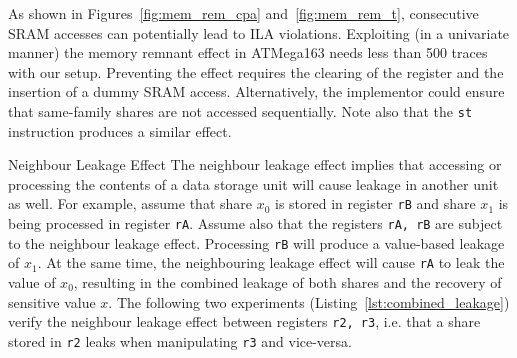 As shown in Figures~\ref{fig:mem_rem_cpa} and~\ref{fig:mem_rem_t}, consecutive SRAM accesses can potentially lead to ILA violations. Exploiting (in a univariate manner) the memory remnant effect in ATMega163 needs less than 500 traces with our setup. Preventing the effect requires the clearing of the register and the insertion of a dummy SRAM access. Alternatively, the implementor could ensure that same-family shares are not accessed sequentially. Note also that the \texttt{st} instruction produces a similar effect.
\begin{subsection}{Neighbour Leakage Effect}\label{combined_leakage}
The neighbour leakage effect implies that accessing or processing the contents of a data storage unit will cause leakage in another unit as well. For example, assume that share $x_0$ is stored in register \texttt{rB} and share $x_1$ is being processed in register \texttt{rA}. Assume also that the registers \texttt{rA, rB} are subject to the neighbour leakage effect. Processing \texttt{rB} will produce a value-based leakage of $x_1$. At the same time, the neighbouring leakage effect will cause \texttt{rA} to leak the value of $x_0$, resulting in the combined leakage of both shares and the recovery of sensitive value $x$. The following two experiments (Listing~\ref{lst:combined_leakage}) verify the neighbour leakage effect between registers \texttt{r2, r3}, i.e. that a share stored in \texttt{r2} leaks when manipulating \texttt{r3} and vice-versa. 



\end{subsection}

